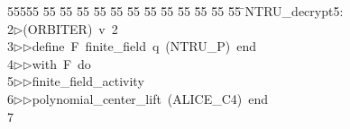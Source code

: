 %
%
\begin{tabbing}
55555 \= 55 \= 55 \= 55 \= 55 \= 55 \= 55 \= 55 \= 55 \= 55 \= 55 \= 55 \= 55 \= \>NTRU\_decrypt5:\\[0pt]
2\>$\triangleright$\>(ORBITER)\ v\ 2\ \\[0pt]
3\>$\triangleright$\>$\triangleright$\>define\ F\ finite\_field\ q\ (NTRU\_P)\ end\ \\[0pt]
4\>$\triangleright$\>$\triangleright$\>with\ F\ do\ \\[0pt]
5\>$\triangleright$\>$\triangleright$\>finite\_field\_activity\ \\[0pt]
6\>$\triangleright$\>$\triangleright$\>polynomial\_center\_lift\ (ALICE\_C4)\ end\\[0pt]
7\>\end{tabbing}
